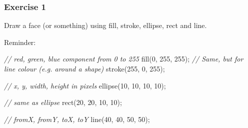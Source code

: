 \documentclass[ignorenonframetext,]{beamer}
\newenvironment{Shaded}{}{}
\newcommand{\DecValTok}[1]{\textcolor[rgb]{0.25,0.63,0.44}{{#1}}}
\newcommand{\CommentTok}[1]{\textcolor[rgb]{0.38,0.63,0.69}{\textit{{#1}}}}
\newcommand{\FunctionTok}[1]{\textcolor[rgb]{0.02,0.16,0.49}{{#1}}}
\newcommand{\NormalTok}[1]{{#1}}
\begin{document}
\begin{frame}[fragile]\frametitle{Exercise 1}

Draw a face (or something) using fill, stroke, ellipse, rect and line.

Reminder:

\begin{Shaded}
\begin{Highlighting}[]
\CommentTok{// red, green, blue component from 0 to 255}
\FunctionTok{fill}\NormalTok{(}\DecValTok{0}\NormalTok{, }\DecValTok{255}\NormalTok{, }\DecValTok{255}\NormalTok{);}
\CommentTok{// Same, but for line colour (e.g. around a shape)}
\FunctionTok{stroke}\NormalTok{(}\DecValTok{255}\NormalTok{, }\DecValTok{0}\NormalTok{, }\DecValTok{255}\NormalTok{);}

\CommentTok{// x, y, width, height in pixels}
\FunctionTok{ellipse}\NormalTok{(}\DecValTok{10}\NormalTok{, }\DecValTok{10}\NormalTok{, }\DecValTok{10}\NormalTok{, }\DecValTok{10}\NormalTok{);}

\CommentTok{// same as ellipse}
\FunctionTok{rect}\NormalTok{(}\DecValTok{20}\NormalTok{, }\DecValTok{20}\NormalTok{, }\DecValTok{10}\NormalTok{, }\DecValTok{10}\NormalTok{);}

\CommentTok{// fromX, fromY, toX, toY}
\FunctionTok{line}\NormalTok{(}\DecValTok{40}\NormalTok{, }\DecValTok{40}\NormalTok{, }\DecValTok{50}\NormalTok{, }\DecValTok{50}\NormalTok{);}
\end{Highlighting}
\end{Shaded}

\end{frame}
\end{document}
